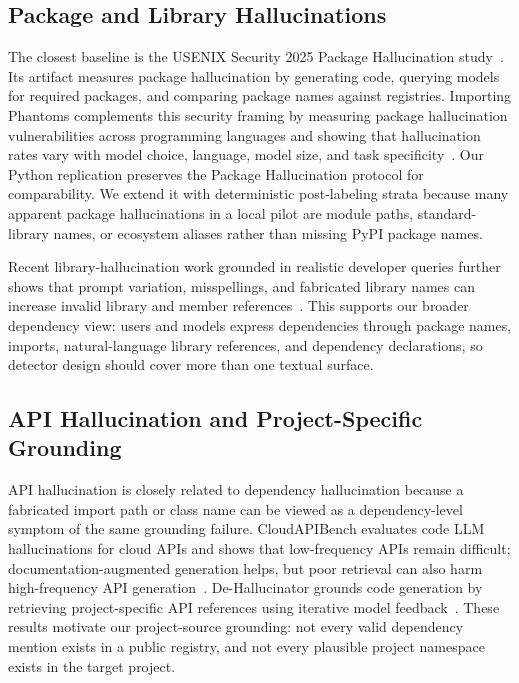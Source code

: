 \documentclass[pdflatex,sn-basic]{sn-jnl}
\begin{document}
\subsection{Package and Library Hallucinations}

The closest baseline is the USENIX Security 2025 Package Hallucination study~\citep{Spracklen2025}. Its artifact measures package hallucination by generating code, querying models for required packages, and comparing package names against registries. Importing Phantoms complements this security framing by measuring package hallucination vulnerabilities across programming languages and showing that hallucination rates vary with model choice, language, model size, and task specificity~\citep{Krishna2025Phantoms}. Our Python replication preserves the Package Hallucination protocol for comparability. We extend it with deterministic post-labeling strata because many apparent package hallucinations in a local pilot are module paths, standard-library names, or ecosystem aliases rather than missing PyPI package names.

Recent library-hallucination work grounded in realistic developer queries further shows that prompt variation, misspellings, and fabricated library names can increase invalid library and member references~\citep{Twist2025LibHallu}. This supports our broader dependency view: users and models express dependencies through package names, imports, natural-language library references, and dependency declarations, so detector design should cover more than one textual surface.

\subsection{API Hallucination and Project-Specific Grounding}

API hallucination is closely related to dependency hallucination because a fabricated import path or class name can be viewed as a dependency-level symptom of the same grounding failure. CloudAPIBench evaluates code LLM hallucinations for cloud APIs and shows that low-frequency APIs remain difficult; documentation-augmented generation helps, but poor retrieval can also harm high-frequency API generation~\citep{Jain2024}. De-Hallucinator grounds code generation by retrieving project-specific API references using iterative model feedback~\citep{Eghbali2024}. These results motivate our project-source grounding: not every valid dependency mention exists in a public registry, and not every plausible project namespace exists in the target project.
\end{document}
